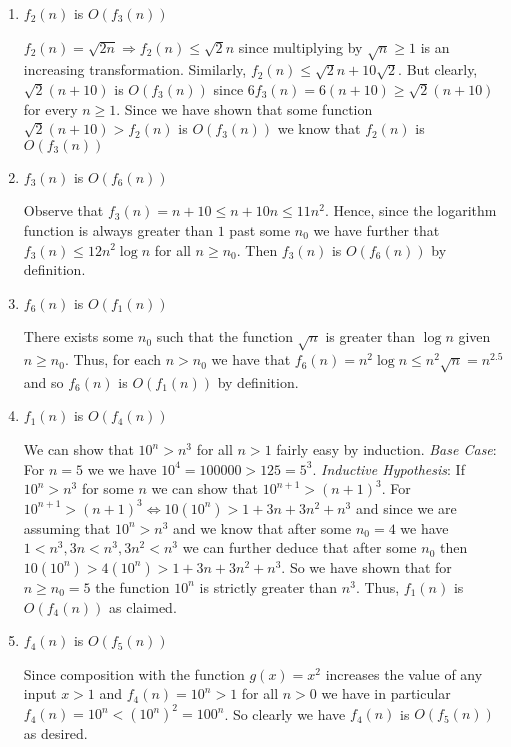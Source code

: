 \documentclass{article}
\begin{document}
\begin{enumerate}
\item $f_2(n)$ is $O(f_3(n))$

$f_2(n)=\sqrt{2 n} \Rightarrow f_2(n) \leq \sqrt{2} n $ since multiplying by $\sqrt{n}\geq1 $ is an increasing transformation. Similarly, $f_2(n)\leq \sqrt{2} n + 10 \sqrt{2}$. But clearly, $\sqrt{2}(n+10)$ is $O(f_3(n))$ since $6 f_3(n) = 6 (n+10)\geq \sqrt{2}(n+10)$ for every $n \geq 1$. Since we have shown that some function $\sqrt{2}(n+10) > f_2(n)$ is $O(f_3(n))$ we know that $f_2(n)$ is $O(f_3(n))$
\item $f_3(n)$ is $O(f_6(n))$

Observe that  $f_3(n)=n+10 \leq n+10 n \leq 11 n^2$. Hence, since the logarithm function is always greater than $1$ past some $n_0$ we have further that $f_3(n) \leq 12n^2 \log{n}$ for all $n\geq  n_0$. Then $f_3(n)$ is $O(f_6(n))$ by definition.

\item $f_6(n)$ is $O(f_1(n))$

There exists some $n_0$ such that the function $\sqrt{n}$ is greater than $\log{n}$ given $n\geq n_0$. Thus, for each $n>n_0$ we have that $f_6(n)=n^2 \log{n}\leq n^2 \sqrt{n}=n^{2.5}$ and so $f_6(n)$ is $O(f_1(n))$ by definition.

\item $f_1(n)$ is $O(f_4(n))$

We can show that $10^n > n^{3}$ for all $n>1$ fairly easy by induction. \emph{Base Case}: For $n=5$ we we have $10^4=100000>125=5^{3}$. \emph{Inductive Hypothesis}: If $10^n > n^{3}$ for some $n$ we can show that $10^{n+1} > (n+1)^{3}$. For $10^{n+1} > (n+1)^{3} \Leftrightarrow 10(10^n)>1+3 n+3 n^2+n^3$ and since we are assuming that $10^n > n^{3}$  and we know that after some $n_0=4$ we have $1<n^3, 3n<n^3, 3n^2<n^3$ we can further deduce that after some $n_0$ then $10(10^n)>4(10^n)>1+3n+3n^2+n^3$. So we have shown that for $n\geq n_0=5$ the function $10^n$ is strictly greater than $n^3$. Thus,  $f_1(n)$ is $O(f_4(n))$ as claimed.

\item $f_4(n)$ is $O(f_5(n))$

Since composition with the function $g(x)=x^2$ increases the value of any input $x>1$ and $f_4(n)=10^n>1$ for all $n>0$ we have in particular $f_4(n)=10^n<(10^n)^2=100^n$. So clearly we have $f_4(n)$ is $O(f_5(n))$ as desired.

\end{enumerate}
\end{document}
